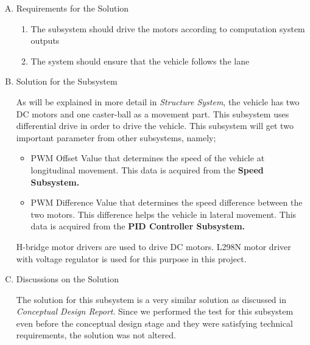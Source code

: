 \documentclass[a4paper,12pt]{article}
\begin{document}
\begin{enumerate}[A.]

\item {Requirements for the Solution}


\begin{enumerate}[1)]

\item The subsystem should drive the motors according to computation system outputs

\item The system should ensure that the vehicle follows the lane 	

\end{enumerate}


\item {Solution for the Subsystem}


As will be explained in more detail in \textit{Structure System}, the vehicle has two DC motors and one caster-ball as a movement part. This subsystem uses differential drive in order to drive the vehicle. This subsystem will get two important parameter from other subsystems, namely;


\begin{itemize}

\item PWM Offset Value that determines the speed of the vehicle at longitudinal movement. This data is acquired from the \textbf{Speed Subsystem.} 	

\item PWM Difference Value that determines the speed difference between the two motors. This difference helps the vehicle in lateral movement. This data is acquired from the \textbf{PID Controller Subsystem.} 	

\end{itemize}	


H-bridge motor drivers are used to drive DC motors. L298N motor driver with voltage regulator is used for this purpose in this project. 


\item {Discussions on the Solution}


The solution for this subsystem is a very similar solution as discussed in \textit{Conceptual Design Report}. Since we performed the test for this subsystem even before the conceptual design stage and they were satisfying technical requirements, the solution was not altered. 



\end{enumerate}
\end{document}
